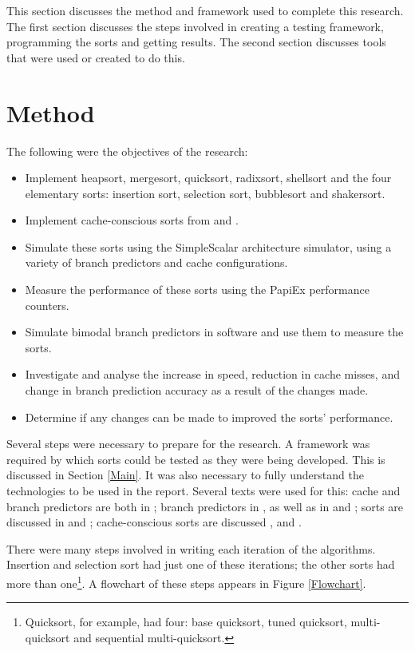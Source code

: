 \label{method}
This section discusses the method and framework used to complete this research.
The first section discusses the steps involved in creating a testing framework,
programming the sorts and getting results. The second section discusses tools
that were used or created to do this.

\section{Method}

The following were the objectives of the research:
\begin{itemize}
\item Implement heapsort, mergesort, quicksort, radixsort, shellsort and the four
elementary sorts: insertion sort, selection sort, bubblesort and shakersort.
\item Implement cache-conscious sorts from \cite{LaMarca96} and
\cite{LaMarca99}.
\item Simulate these sorts using the SimpleScalar architecture simulator, using a
variety of branch predictors and cache configurations.
\item Measure the performance of these sorts using the PapiEx performance
counters.
\item Simulate bimodal branch predictors in software and use them to measure the
sorts.
\item Investigate and analyse the increase in speed, reduction in cache misses, 
and change in branch prediction accuracy as a result of the changes made.
\item Determine if any changes can be made to improved the sorts' performance.
\end{itemize}

Several steps were necessary to prepare for the research. A framework was
required by which sorts could be tested as they were being developed. This is
discussed in Section \ref{Main}. It was also necessary to fully understand the
technologies to be used in the report. Several texts were used for this: cache
and branch predictors are both in \cite{HennessyPatterson90}; branch predictors
in \cite{Uht97}, as well as in \cite{McFarling93} and \cite{Smith81}; sorts are
discussed in \cite{Sedgewick02} and \cite{Knuth98}; cache-conscious sorts are
discussed \cite{LaMarca96}, \cite{LaMarca99} and \cite{LaMarcaHeap96}.

There were many steps involved in writing each iteration of the algorithms.
Insertion and selection sort had just one of these iterations; the other
sorts had more than one\footnote{Quicksort, for example, had four: base
quicksort, tuned quicksort, multi-quicksort and sequential multi-quicksort.}. A
flowchart of these steps appears in Figure \vref{Flowchart}.

